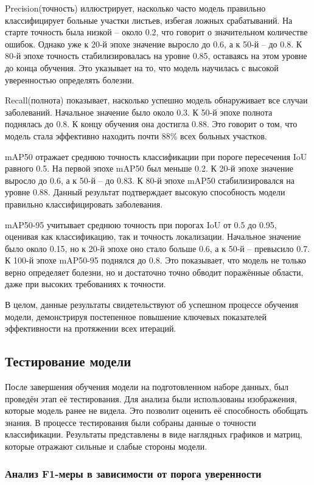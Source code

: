 {Precision(точность) иллюстрирует, насколько часто модель правильно классифицирует больные участки листьев, избегая ложных срабатываний. На старте точность была низкой -- около 0.2, что говорит о значительном количестве ошибок. Однако уже к 20-й эпохе значение выросло до 0.6, а к 50-й -- до 0.8. К 80-й эпохе точность стабилизировалась на уровне 0.85, оставаясь на этом уровне до конца обучения. Это указывает на то, что модель научилась с высокой уверенностью определять болезни.

Recall(полнота) показывает, насколько успешно модель обнаруживает все случаи заболеваний. Начальное значение было около 0.3. К 50-й эпохе полнота поднялась до 0.8. К концу обучения она достигла 0.88. Это говорит о том, что модель стала эффективно находить почти 88\% всех больных участков.

mAP50 отражает среднюю точность классификации при пороге пересечения IoU равного 0.5. На первой эпохе mAP50 был меньше 0.2. К 20-й эпохе значение выросло до 0.6, а к 50-й -- до 0.83. К 80-й эпохе mAP50 стабилизировался на уровне 0.88. Данный результат подтверждает высокую способность модели правильно классифицировать заболевания.

mAP50-95 учитывает среднюю точность при порогах IoU от 0.5 до 0.95, оценивая как классификацию, так и точность локализации. Начальное значение было около 0.15, но к 20-й эпохе оно стало больше 0.6, а к 50-й -- превысило 0.7. К 100-й эпохе mAP50-95 поднялся до 0.8. Это показывает, что модель не только верно определяет болезни, но и достаточно точно обводит поражённые области, даже при высоких требованиях к точности.

В целом, данные результаты свидетельствуют об успешном процессе обучения модели, демонстрируя постепенное повышение ключевых показателей эффективности на протяжении всех итераций.

\subsection{Тестирование модели}

После завершения обучения модели на подготовленном наборе данных, был проведён этап её тестирования. Для анализа были использованы изображения, которые модель ранее не видела. Это позволит оценить её способность обобщать знания. В процессе тестирования были собраны данные о точности классификации. Результаты представлены в виде наглядных графиков и матриц, которые отражают сильные и слабые стороны модели. 

\subsubsection{Анализ F1-меры в зависимости от порога уверенности}

}
